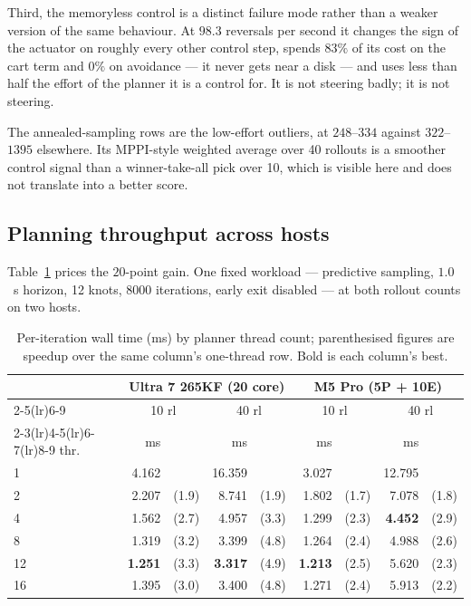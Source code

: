 \documentclass[conference]{IEEEtran}
\begin{document}
Third, the memoryless control is a distinct failure mode rather than a weaker
version of the same behaviour. At $98.3$ reversals per second it changes the
sign of the actuator on roughly every other control step, spends $83\%$ of its
cost on the cart term and $0\%$ on avoidance --- it never gets near a disk --- and
uses less than half the effort of the planner it is a control for. It is not
steering badly; it is not steering.

The annealed-sampling rows are the low-effort outliers, at $248$--$334$ against
$322$--$1395$ elsewhere. Its MPPI-style weighted average over 40 rollouts is a
smoother control signal than a winner-take-all pick over 10, which is visible
here and does not translate into a better score.

\subsection{Planning throughput across hosts}
\label{sec:machines}

Table~\ref{tab:machines} prices the $20$-point gain. One fixed workload ---
predictive sampling, $1.0$~s horizon, 12 knots, 8000 iterations, early exit
disabled --- at both rollout counts on two hosts.

\begin{table}[t]
\caption{Per-iteration wall time (ms) by planner thread count; parenthesised
figures are speedup over the same column's one-thread row. Bold is each
column's best.}
\label{tab:machines}
\centering
\footnotesize
\setlength{\tabcolsep}{3pt}
\begin{tabular}{@{}lrlrlrlrl@{}}
\toprule
& \multicolumn{4}{c}{Ultra 7 265KF (20 core)} &
  \multicolumn{4}{c}{M5 Pro (5P + 10E)} \\
\cmidrule(lr){2-5}\cmidrule(lr){6-9}
& \multicolumn{2}{c}{10 rl} & \multicolumn{2}{c}{40 rl}
& \multicolumn{2}{c}{10 rl} & \multicolumn{2}{c}{40 rl} \\
\cmidrule(lr){2-3}\cmidrule(lr){4-5}\cmidrule(lr){6-7}\cmidrule(lr){8-9}
thr. & ms & & ms & & ms & & ms & \\
\midrule
1  & 4.162 & & 16.359 & & 3.027 & & 12.795 & \\
2  & 2.207 & (1.9) &  8.741 & (1.9) & 1.802 & (1.7) &  7.078 & (1.8) \\
4  & 1.562 & (2.7) &  4.957 & (3.3) & 1.299 & (2.3) &  \textbf{4.452} & (2.9) \\
8  & 1.319 & (3.2) &  3.399 & (4.8) & 1.264 & (2.4) &  4.988 & (2.6) \\
12 & \textbf{1.251} & (3.3) & \textbf{3.317} & (4.9) & \textbf{1.213} & (2.5) &  5.620 & (2.3) \\
16 & 1.395 & (3.0) &  3.400 & (4.8) & 1.271 & (2.4) &  5.913 & (2.2) \\
\bottomrule
\end{tabular}
\end{table}
\end{document}
